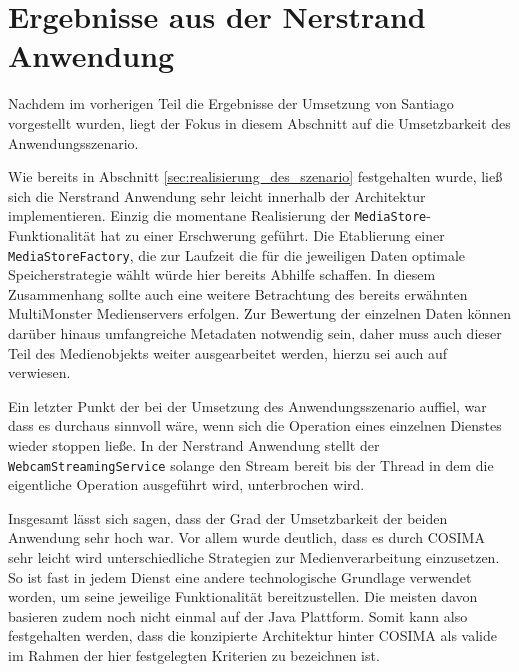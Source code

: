 

\section{Ergebnisse aus der Nerstrand Anwendung} %
\label{sec:ergebnisse_aus_der_nerstrand_anwendung}

  Nachdem im vorherigen Teil die Ergebnisse der Umsetzung von Santiago vorgestellt wurden, liegt der Fokus in diesem Abschnitt auf die Umsetzbarkeit des Anwendungsszenario.
  
  Wie bereits in Abschnitt \ref{sec:realisierung_des_szenario} festgehalten wurde, ließ sich die Nerstrand Anwendung sehr leicht innerhalb der Architektur implementieren. Einzig die momentane Realisierung der \verb!MediaStore!-Funktionalität hat zu einer Erschwerung geführt. Die Etablierung einer \verb!MediaStoreFactory!, die zur Laufzeit die für die jeweiligen Daten optimale Speicherstrategie wählt würde hier bereits Abhilfe schaffen. In diesem Zusammenhang sollte auch eine weitere Betrachtung des bereits erwähnten MultiMonster Medienservers erfolgen. Zur Bewertung der einzelnen Daten können darüber hinaus umfangreiche Metadaten notwendig sein, daher muss auch dieser Teil des Medienobjekts weiter ausgearbeitet werden, hierzu sei auch auf~\citep{lehmann09} verwiesen.
  
  Ein letzter Punkt der bei der Umsetzung des Anwendungsszenario auffiel, war dass es durchaus sinnvoll wäre, wenn sich die Operation eines einzelnen Dienstes wieder stoppen ließe. In der Nerstrand Anwendung stellt der \verb!WebcamStreamingService! solange den Stream bereit bis der Thread in dem die eigentliche Operation ausgeführt wird, unterbrochen wird.


  Insgesamt lässt sich sagen, dass der Grad der Umsetzbarkeit der beiden Anwendung sehr hoch war. Vor allem wurde deutlich, dass es durch COSIMA sehr leicht wird unterschiedliche Strategien zur Medienverarbeitung einzusetzen. So ist fast in jedem Dienst eine andere technologische Grundlage verwendet worden, um seine jeweilige Funktionalität bereitzustellen. Die meisten davon basieren zudem noch nicht einmal auf der Java Plattform. Somit kann also festgehalten werden, dass die konzipierte Architektur hinter COSIMA als valide im Rahmen der hier festgelegten Kriterien zu bezeichnen ist.

